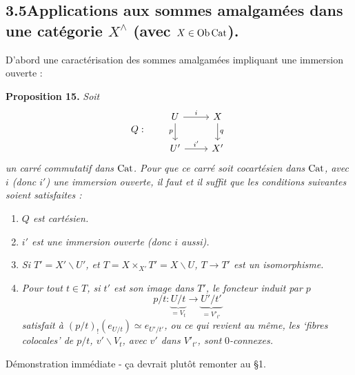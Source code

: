 \subsection*{3.5\quad Applications aux sommes amalgamées dans une catégorie $X^{\wedge}$ (avec $X \in \operatorname{Ob} \mathrm{Cat}$).}

D'abord une caractérisation des sommes amalgamées impliquant une immersion ouverte :

\textbf{Proposition 15.} \textit{Soit}
\[
Q : \qquad
\begin{tikzcd}
U \ar[r, "i"] \ar[d, "p"'] & X \ar[d, "q"] \\
U' \ar[r, "i'"] & X'
\end{tikzcd}
\]
\textit{un carré commutatif dans} $\mathrm{Cat}$\textit{. Pour que ce carré soit cocartésien dans} $\mathrm{Cat}$\textit{, avec $i$ (donc $i'$) une immersion ouverte, il faut et il suffit que les conditions suivantes soient satisfaites :}

\begin{enumerate}[label={}, leftmargin=2.5em]
\item[\textit{a)}] \textit{$Q$ est cartésien.}
\item[\textit{b)}] \textit{$i'$ est une immersion ouverte (donc $i$ aussi).}
\item[\textit{c)}] \textit{Si $T' = X' \backslash U'$, et $T = X \times_{X'} T' = X \backslash U$, $T \longrightarrow T'$ est un isomorphisme.}
\item[\textit{d)}] \textit{Pour tout $t \in T$, si $t'$ est son image dans $T'$, le foncteur induit par $p$}
\[
p/t : \underbrace{U/t}_{= V_t} \longrightarrow \underbrace{U'/t'}_{= V'_{t'}}
\]
\textit{satisfait à $(p/t)_!(e_{U/t}) \simeq e_{U'/t'}$, ou ce qui revient au même, les `fibres colocales' de $p/t$, $v' \backslash V_t$, avec $v'$ dans $V'_{t'}$, sont} $0$\textit{-connexes.}
\end{enumerate}

Démonstration immédiate - ça devrait plutôt remonter au §1.

